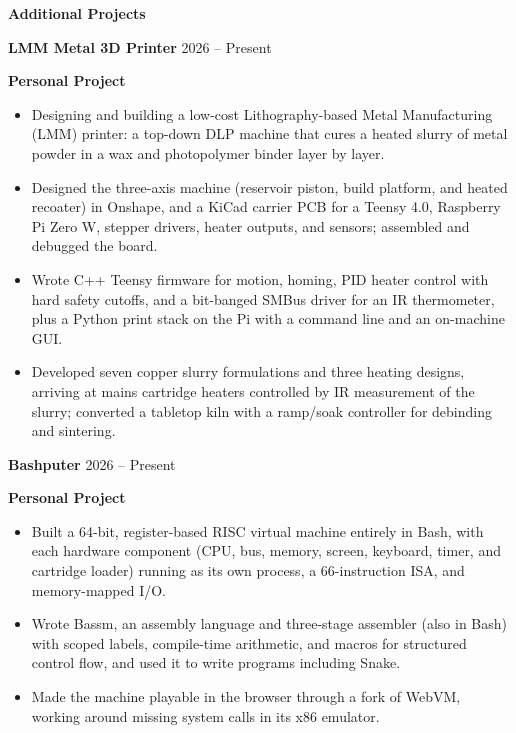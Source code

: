 \begin{center}
    \textbf{Additional Projects}
\end{center}
\textbf{LMM Metal 3D Printer} \hfill 2026 -- Present

\textbf{Personal Project}\\
\begin{itemize}[noitemsep, topsep=0pt, partopsep=0pt, parsep=0pt]
    \item Designing and building a low-cost Lithography-based Metal Manufacturing (LMM) printer: a top-down DLP machine that cures a heated slurry of metal powder in a wax and photopolymer binder layer by layer.

    \item Designed the three-axis machine (reservoir piston, build platform, and heated recoater) in Onshape, and a KiCad carrier PCB for a Teensy 4.0, Raspberry Pi Zero W, stepper drivers, heater outputs, and sensors; assembled and debugged the board.

    \item Wrote C++ Teensy firmware for motion, homing, PID heater control with hard safety cutoffs, and a bit-banged SMBus driver for an IR thermometer, plus a Python print stack on the Pi with a command line and an on-machine GUI.

    \item Developed seven copper slurry formulations and three heating designs, arriving at mains cartridge heaters controlled by IR measurement of the slurry; converted a tabletop kiln with a ramp/soak controller for debinding and sintering.
\end{itemize}

\vspace{12pt}

\textbf{Bashputer} \hfill 2026 -- Present

\textbf{Personal Project}\\
\begin{itemize}[noitemsep, topsep=0pt, partopsep=0pt, parsep=0pt]
    \item Built a 64-bit, register-based RISC virtual machine entirely in Bash, with each hardware component (CPU, bus, memory, screen, keyboard, timer, and cartridge loader) running as its own process, a 66-instruction ISA, and memory-mapped I/O.

    \item Wrote Bassm, an assembly language and three-stage assembler (also in Bash) with scoped labels, compile-time arithmetic, and macros for structured control flow, and used it to write programs including Snake.

    \item Made the machine playable in the browser through a fork of WebVM, working around missing system calls in its x86 emulator.
\end{itemize}

